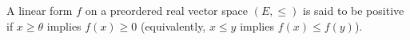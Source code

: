 A linear form $f$ on a preordered real vector space $(E, \leq)$ is said to be positive if $x \geq \theta$ implies $f(x) \geq 0$ (equivalently, $x \leq y$ implies $f(x) \leq f(y)$).
